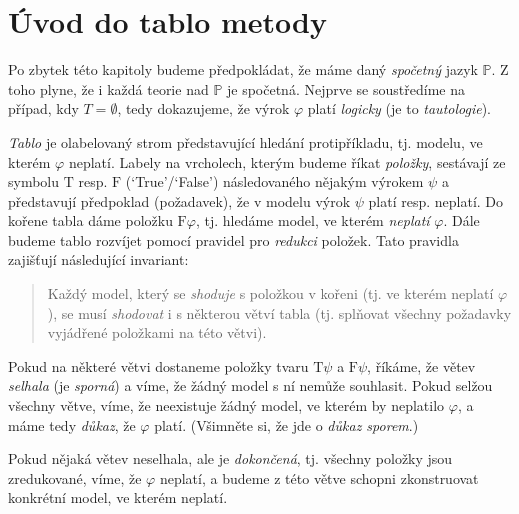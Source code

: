 \section{Úvod do tablo metody}

Po zbytek této kapitoly budeme předpokládat, že máme daný \emph{spočetný} jazyk $\mathbb P$. Z toho plyne, že i každá teorie nad $\mathbb P$ je spočetná. Nejprve se soustředíme na případ, kdy $T=\emptyset$, tedy dokazujeme, že výrok $\varphi$ platí \emph{logicky} (je to \emph{tautologie}). 

\emph{Tablo} je olabelovaný strom představující hledání protipříkladu, tj. modelu, ve kterém $\varphi$ neplatí. Labely na vrcholech, kterým budeme říkat \emph{položky}, sestávají ze symbolu $\mathrm{T}$ resp. $\mathrm{F}$ (`True'/`False') následovaného nějakým výrokem $\psi$ a představují předpoklad (požadavek), že v modelu výrok $\psi$ platí resp. neplatí. Do kořene tabla dáme položku $\mathrm{F}\varphi$, tj. hledáme model, ve kterém \emph{neplatí} $\varphi$. Dále budeme tablo rozvíjet pomocí pravidel pro \emph{redukci} položek. Tato pravidla zajišťují následující invariant: 
\begin{quote}
    Každý model, který se \emph{shoduje} s položkou v kořeni (tj. ve kterém neplatí $\varphi$), se musí \emph{shodovat} i s některou větví tabla (tj. splňovat všechny požadavky vyjádřené položkami na této větvi).
\end{quote}
Pokud na některé větvi dostaneme položky tvaru $\mathrm{T}\psi$ a $\mathrm{F}\psi$, říkáme, že větev \emph{selhala} (je \emph{sporná}) a víme, že žádný model s ní nemůže souhlasit. Pokud selžou všechny větve, víme, že neexistuje žádný model, ve kterém by neplatilo $\varphi$, a máme tedy \emph{důkaz}, že $\varphi$ platí. (Všimněte si, že jde o \emph{důkaz sporem}.)

Pokud nějaká větev neselhala, ale je \emph{dokončená}, tj. všechny položky jsou zredukované, víme, že $\varphi$ neplatí, a budeme z této větve schopni zkonstruovat konkrétní model, ve kterém neplatí.


